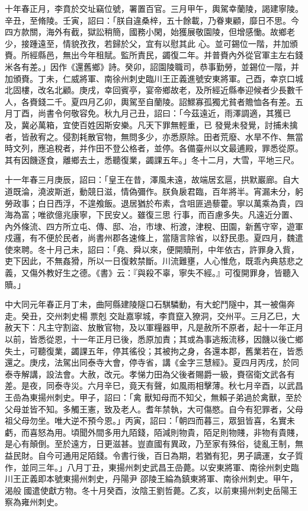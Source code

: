 \begin{pinyinscope}
 十年春正月，李賁於交址竊位號，署置百官。三月甲午，輿駕幸蘭陵，謁建寧陵。辛丑，至脩陵。壬寅，詔曰：「朕自違桑梓，五十餘載，乃眷東顧，靡日不思。今四方款關，海外有截，獄訟稍簡，國務小閑，始獲展敬園陵，但增感慟。故鄉老少，接踵遠至，情貌孜孜，若歸於父，宜有以慰其此
 心。並可錫位一階，并加頒賚。所經縣邑，無出今年租賦。監所責民，蠲復二年。并普賚內外從官軍主左右錢米各有差。」因作《還舊鄉》詩。癸卯，詔園陵職司，恭事勤勞，並錫位一階，并加頒賚。丁未，仁威將軍、南徐州刺史臨川王正義進號安東將軍。己酉，幸京口城北固樓，改名北顧。庚戌，幸回賓亭，宴帝鄉故老，及所經近縣奉迎候者少長數千人，各賚錢二千。夏四月乙卯，輿駕至自蘭陵。詔鰥寡孤獨尤貧者贍恤各有差。五月丁酉，尚書令何敬容免。秋九月己丑，詔曰：「今茲遠近，雨澤調適，其獲已及，冀必萬箱，宜使百姓因斯安樂。凡天下罪無輕重，已
 發覺未發覺，討捕未擒者，皆赦宥之。侵割耗散官物，無問多少，亦悉原除。田者荒廢、水旱不作、無當時文列，應追稅者，并作田不登公格者，並停。各備臺州以文最逋殿，罪悉從原。其有因饑逐食，離鄉去土，悉聽復業，蠲課五年。」冬十二月，大雪，平地三尺。



 十一年春三月庚辰，詔曰：「皇王在昔，澤風未遠，故端居玄扈，拱默巖廊。自大道既淪，澆波斯逝，動競日滋，情偽彌作。朕負扆君臨，百年將半。宵漏未分，躬勞政事；白日西浮，不遑飧飯。退居猶於布素，含咀匪過藜藿。寧以萬乘為貴，四海為富；唯欲億兆康寧，下民安乂。雖復三思
 行事，而百慮多失。凡遠近分置、內外條流、四方所立屯、傳、邸、冶，市埭、桁渡，津稅、田園，新舊守宰，遊軍戍邏，有不便於民者，尚書州郡各速條上，當隨言除省，以舒民患。夏四月，魏遣使來聘。冬十月己未，詔曰：「堯、舜以來，便開贖刑，中年依古，許罪身入貲，吏下因此，不無姦猾，所以一日復敕禁斷。川流難壅，人心惟危，既乖內典慈悲之義，又傷外教好生之德。《書》云：『與殺不辜，寧失不經。』可復開罪身，皆聽入贖。」



 中大同元年春正月丁未，曲阿縣建陵隧口石騏驎動，有大蛇鬥隧中，其一被傷奔走。癸丑，交州刺史楊票剋
 交趾嘉寧城，李賁竄入獠洞，交州平。三月乙巳，大赦天下：凡主守割盜、放散官物，及以軍糧器甲，凡是赦所不原者，起十一年正月以前，皆悉從恩，十一年正月已後，悉原加責；其或為事逃叛流移，因饑以後亡鄉失土，可聽復業，蠲課五年，停其徭役；其被拘之身，各還本郡，舊業若在，皆悉還之。庚戌，法駕出同泰寺大會，停寺省，講《金字三慧經》。夏四月丙戌，於同泰寺解講，設法會。大赦，改元。孝悌力田為父後者賜爵一級，賚宿衛文武各有差。是夜，同泰寺災。六月辛巳，竟天有聲，如風雨相擊薄。秋七月辛酉，以武昌王嵒為東揚州刺史。甲子，詔曰：「禽
 獸知母而不知父，無賴子弟過於禽獸，至於父母並皆不知。多觸王憲，致及老人。耆年禁執，大可傷愍。自今有犯罪者，父母祖父母勿坐。唯大逆不預今恩。」丙寅，詔曰：「朝四而暮三，眾狙皆喜，名實未虧，而喜怒為用。頃聞外間多用九陌錢，陌減則物貴，陌足則物賤，非物有貴賤，是心有顛倒。至於遠方，日更滋甚。豈直國有異政，乃至家有殊俗，徒亂王制，無益民財。自今可通用足陌錢。令書行後，百日為期，若猶有犯，男子謫運，女子質作，並同三年。」八月丁丑，東揚州刺史武昌王嵒薨。以安東將軍、南徐州刺史臨川王正義即本號東揚州刺史，丹陽尹
 邵陵王綸為鎮東將軍、南徐州刺史。甲午，渴般國遣使獻方物。冬十月癸酉，汝陰王劉哲薨。乙亥，以前東揚州刺史岳陽王察為雍州刺史。




\end{pinyinscope}
